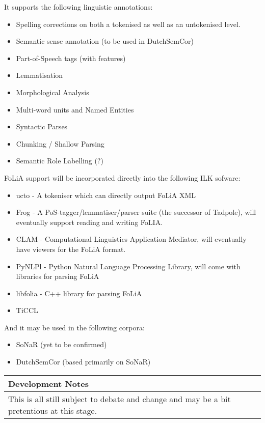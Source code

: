 \documentclass[a4paper,12pt]{article}
\newenvironment{devnotes}
{\newpage
\begin{center}
    \begin{tabular}[h!]{|p{0.8\textwidth}|}
    \hline
    {\bf Development Notes}\\\hline}
{   \\\hline
    \end{tabular}
\end{center}}
\begin{document}
It supports the following linguistic annotations:

\begin{itemize}
\item Spelling corrections on both a tokenised as well as an untokenised level.
\item Semantic sense annotation (to be used in DutchSemCor)
\item Part-of-Speech tags (with features)
\item Lemmatisation
\item Morphological Analysis
\item Multi-word units and Named Entities
\item Syntactic Parses
\item Chunking / Shallow Parsing
\item Semantic Role Labelling (?)
\end{itemize}

FoLiA support will be incorporated directly into the following ILK sofware:


\begin{itemize} 
\item ucto - A tokeniser which can directly output FoLiA XML 
\item Frog - A PoS-tagger/lemmatiser/parser suite (the successor of Tadpole), will eventually support reading and writing FoLIA.
\item CLAM - Computational Linguistics Application Mediator, will eventually have viewers for the FoLiA format.
\item PyNLPl - Python Natural Language Processing Library, will come with libraries for parsing FoLiA
\item libfolia - C++ library for parsing FoLiA
\item TiCCL
\end{itemize}

And it may be used in the following corpora:

\begin{itemize} 
\item SoNaR (yet to be confirmed)
\item DutchSemCor (based primarily on SoNaR)
\end{itemize}

\begin{devnotes}
This is all still subject to debate and change and may be a bit pretentious at this stage.
\end{devnotes}
\end{document}
